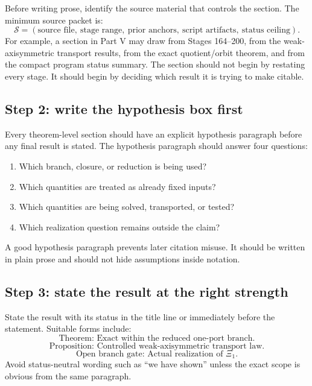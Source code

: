 Before writing prose, identify the source material that controls the section.  The minimum source packet is:
\[
\mathcal S
=
(\text{source file},\ \text{stage range},\ \text{prior anchors},\ \text{script artifacts},\ \text{status ceiling}).
\]
For example, a section in Part V may draw from Stages 164--200, from the weak-axisymmetric transport results, from the exact quotient/orbit theorem, and from the compact program status summary.  The section should not begin by restating every stage.  It should begin by deciding which result it is trying to make citable.

\subsection{Step 2: write the hypothesis box first}
\label{subsec:workflow-hypothesis-box-first}

Every theorem-level section should have an explicit hypothesis paragraph before any final result is stated.  The hypothesis paragraph should answer four questions:

\begin{enumerate}[leftmargin=2.0em]
\item Which branch, closure, or reduction is being used?
\item Which quantities are treated as already fixed inputs?
\item Which quantities are being solved, transported, or tested?
\item Which realization question remains outside the claim?
\end{enumerate}

A good hypothesis paragraph prevents later citation misuse.  It should be written in plain prose and should not hide assumptions inside notation.

\subsection{Step 3: state the result at the right strength}
\label{subsec:workflow-state-right-strength}

State the result with its status in the title line or immediately before the statement.  Suitable forms include:
\[
\text{Theorem: Exact within the reduced one-port branch.}
\]
\[
\text{Proposition: Controlled weak-axisymmetric transport law.}
\]
\[
\text{Open branch gate: Actual realization of } \Xi_1.
\]
Avoid status-neutral wording such as ``we have shown'' unless the exact scope is obvious from the same paragraph.

